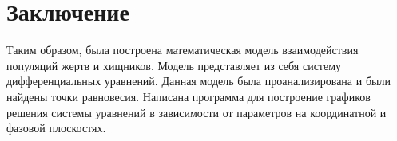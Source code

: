 \section{Заключение}
Таким образом, была построена математическая модель взаимодействия популяций жертв и хищников. Модель представляет из себя систему дифференциальных уравнений. Данная модель была проанализирована и были найдены точки равновесия. Написана программа для построение графиков решения системы уравнений в зависимости от параметров на координатной и фазовой плоскостях.

